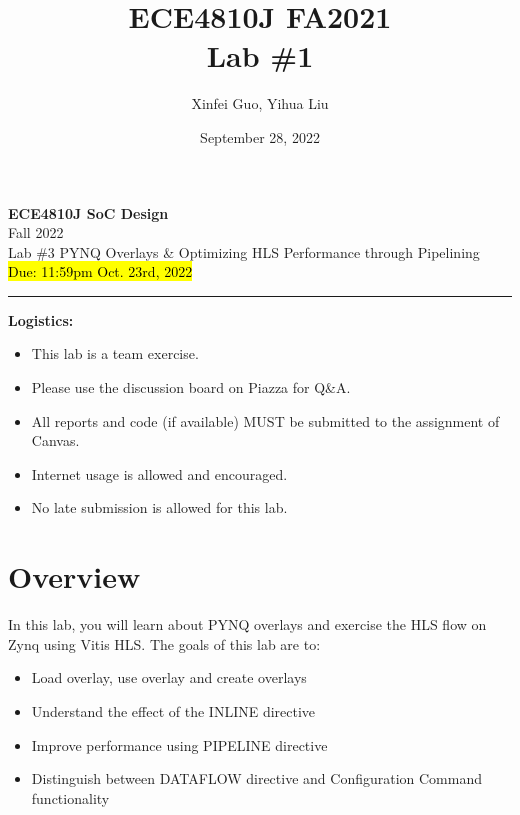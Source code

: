 \documentclass[a4paper,12pt,twoside]{article}
\author{Xinfei Guo, Yihua Liu}
\title{ECE4810J FA2021\\ \small Lab \#1}
\date{September 28, 2022}
\begin{document}
\thispagestyle{fancy}

\begin{center}
    \vspace*{0pt}
    \Large{\textbf{ECE4810J SoC Design}}\\
    \vspace*{2pt}
    \large{Fall 2022}\\
    \vspace*{10pt}
    \Large{\textcolor{caption2color}{Lab \#3 PYNQ Overlays \& Optimizing HLS Performance through Pipelining}}\\
    \normalsize{\hl{Due: 11:59pm Oct. 23rd, 2022}}
    \rule[-5pt]{.97\linewidth}{0.05em}
\end{center}

\textbf{Logistics:}
\begin{itemize}
    \item This lab is a team exercise.
    \item Please use the discussion board on Piazza for Q\&A.
    \item All reports and code (if available) MUST be submitted to the assignment of Canvas.
    \item Internet usage is allowed and encouraged.
    \item No late submission is allowed for this lab.
\end{itemize}
\newpage
\tableofcontents
\newpage
\section{Overview}
In this lab, you will learn about PYNQ overlays and exercise the HLS flow on Zynq using Vitis HLS. The goals of this lab are to:
\begin{itemize}
    \item Load overlay, use overlay and create overlays
    \item Understand the effect of the INLINE directive
    \item Improve performance using PIPELINE directive
    \item Distinguish between DATAFLOW directive and Configuration Command functionality
\end{itemize}
\end{document}
